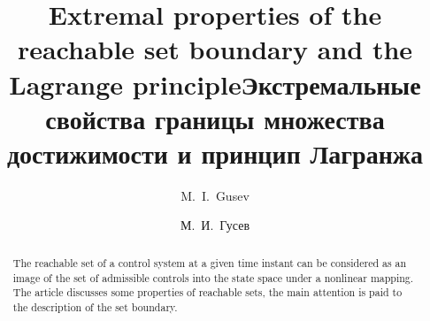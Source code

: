 \begin{englishtitle} %
\title{Extremal properties of the reachable set boundary and the Lagrange principle}
\author{M.~I.~Gusev
}

\maketitle

\begin{abstract}
 The reachable set of a control system at a given time instant can be considered as an image of the set of admissible controls into  the state space under a nonlinear mapping. The article discusses some properties of  reachable sets, the main attention is paid  to the description  of the set boundary.

\end{abstract}
\end{englishtitle}

\iffalse
\documentclass[12pt]{llncs}


\usepackage{iftex}

\ifPDFTeX
\usepackage[T2A]{fontenc}
\usepackage[utf8]{inputenc} %
\usepackage[english,russian]{babel}
\fi

\usepackage{todonotes}

\usepackage[russian]{nla}


\fi
\newtheorem{theo}{Теорема}

\title{Экстремальные свойства границы множества достижимости и принцип Лагранжа}
\author{М.~И.~Гусев}



\maketitle

